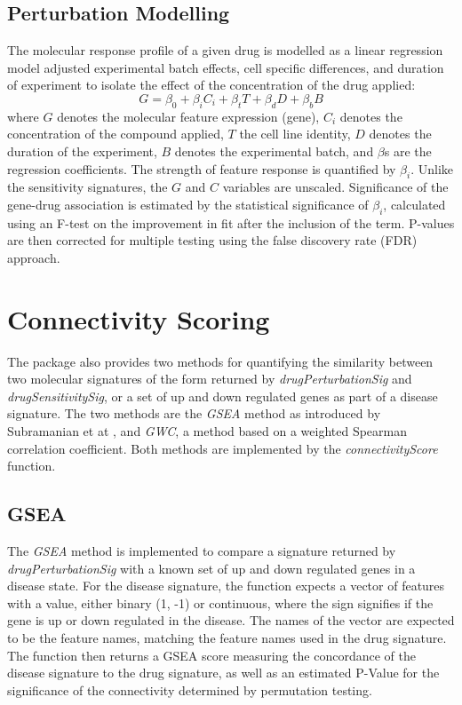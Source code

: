 \documentclass[11pt]{article}
\begin{document}
\subsection{Perturbation Modelling}
The molecular response profile of a given drug is modelled as a linear regression model adjusted experimental batch effects, cell specific differences, and duration of experiment to isolate the effect of the concentration of the drug applied: 
$$G = \beta_{0} + \beta_{i}C_i + \beta_{t}T + \beta_{d}D + \beta_{b}B$$
where $G$ denotes the molecular feature expression (gene), $C_i$ denotes the concentration of the compound applied, $T$ the cell line identity, $D$ denotes the duration of the experiment,  $B$ denotes the experimental batch, and $\beta$s are the regression coefficients. The strength of feature response is quantified by $\beta_i$. 
Unlike the sensitivity signatures, the $G$ and $C$ variables are unscaled. 
Significance of the gene-drug association is estimated by the statistical significance of $\beta_i$, calculated using an F-test on the improvement in fit after the inclusion of the term. P-values are then corrected for multiple testing using the false discovery rate (FDR) approach.


\section{Connectivity Scoring}
The package also provides two methods for quantifying the similarity between two molecular signatures of the form returned by \textit{drugPerturbationSig} and \textit{drugSensitivitySig}, or a set of up and down regulated genes as part of a disease signature. 
The two methods are the \textit{GSEA} method as introduced by Subramanian et at \cite{subramanian_gene_2005}, and \textit{GWC}, a method based on a weighted Spearman correlation coefficient. Both methods are implemented by the \textit{connectivityScore} function.

\subsection{GSEA}

The \textit{GSEA} method is implemented to compare a signature returned by \textit{drugPerturbationSig} with a known set of up and down regulated genes in a disease state. For the disease signature, the function expects a vector of features with a value, either binary (1, -1) or continuous, where the sign signifies if the gene is up or down regulated in the disease. The names of the vector are expected to be the feature names, matching the feature names used in the drug signature. The function then returns a GSEA score measuring the concordance of the disease signature to the drug signature, as well as an estimated P-Value for the significance of the connectivity determined by permutation testing. 
\end{document}
